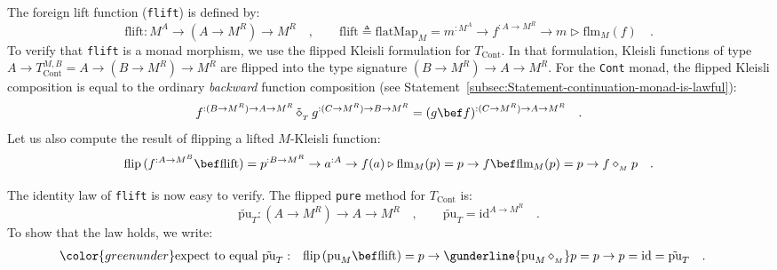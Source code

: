The foreign lift function (\lstinline!flift!) is defined by:
\[
\text{flift}:M^{A}\rightarrow(A\rightarrow M^{R})\rightarrow M^{R}\quad,\quad\quad\text{flift}\triangleq\text{flatMap}_{M}=m^{:M^{A}}\rightarrow f^{:A\rightarrow M^{R}}\rightarrow m\triangleright\text{flm}_{M}(f)\quad.
\]
To verify that \lstinline!flift! is a monad morphism, we use the
flipped Kleisli formulation for $T_{\text{Cont}}$. In that formulation,
Kleisli functions of type $A\rightarrow T_{\text{Cont}}^{M,B}=A\rightarrow(B\rightarrow M^{R})\rightarrow M^{R}$
are flipped into the type signature $(B\rightarrow M^{R})\rightarrow A\rightarrow M^{R}$.
For the \lstinline!Cont! monad, the flipped Kleisli composition is
equal to the ordinary \emph{backward} function composition (see Statement~\ref{subsec:Statement-continuation-monad-is-lawful}):
\begin{equation}
f^{:(B\rightarrow M^{R})\rightarrow A\rightarrow M^{R}}\,\tilde{\diamond}_{_{T}}\,g^{:(C\rightarrow M^{R})\rightarrow B\rightarrow M^{R}}=(g\bef f)^{:(C\rightarrow M^{R})\rightarrow A\rightarrow M^{R}}\quad.\label{eq:continuation-transformer-derivation1}
\end{equation}
Let us also compute the result of flipping a lifted $M$-Kleisli function:
\begin{equation}
\text{flip}\,(f^{:A\rightarrow M^{B}}\bef\text{flift})=p^{:B\rightarrow M^{R}}\rightarrow a^{:A}\rightarrow f(a)\triangleright\text{flm}_{M}(p)=p\rightarrow f\bef\text{flm}_{M}(p)=p\rightarrow f\diamond_{_{M}}p\quad.\label{eq:continuation-transformer-flip-derivation2}
\end{equation}

The identity law of \lstinline!flift! is now easy to verify. The
flipped \lstinline!pure! method for $T_{\text{Cont}}$ is:
\[
\tilde{\text{pu}}_{T}:(A\rightarrow M^{R})\rightarrow A\rightarrow M^{R}\quad,\quad\quad\tilde{\text{pu}}_{T}=\text{id}^{A\rightarrow M^{R}}\quad.
\]
To show that the law holds, we write:
\begin{align*}
{\color{greenunder}\text{expect to equal }\tilde{\text{pu}}_{T}:}\quad & \text{flip}\,(\text{pu}_{M}\bef\text{flift})=p\rightarrow\gunderline{\text{pu}_{M}\,\diamond_{_{M}}}p=p\rightarrow p=\text{id}=\tilde{\text{pu}}_{T}\quad.
\end{align*}

